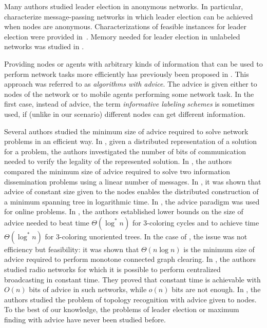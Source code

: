 \documentclass[11pt]{article}
\begin{document}
Many authors \cite{An,AtSn,ASW,BV,YK2,YK3} studied leader election
in anonymous networks. In particular, \cite{BSVCGS,YK3} characterize message-passing networks in which
leader election can be achieved when nodes are anonymous.
Characterizations of feasible instances for leader election were provided in~\cite{C,CM}.
Memory needed for leader election in unlabeled networks was studied in \cite{FP}. 







Providing nodes or agents with arbitrary kinds of information that can be used to perform network tasks more efficiently has previously been
proposed in \cite{AKM01,CFP,DP,EFKR,FGIP,FIP1,FIP2,FKL,FP,FPR,GPPR02,IKP,KKKP02,KKP05,SN,TZ05}. This approach was referred to as
{\em algorithms with advice}.  
The advice is given either to nodes of the network or to mobile agents performing some network task.
In the first case, instead of advice, the term {\em informative labeling schemes} is sometimes used, if (unlike in our scenario) different nodes can get different information.






Several authors studied the minimum size of advice required to solve
network problems in an efficient way. 
 In \cite{KKP05}, given a distributed representation of a solution for a problem,
the authors investigated the number of bits of communication needed to verify the legality of the represented solution.
In \cite{FIP1}, the authors compared the minimum size of advice required to
solve two information dissemination problems using a linear number of messages. 
In \cite{FKL}, it was shown that advice of constant size given to the nodes enables the distributed construction of a minimum
spanning tree in logarithmic time. 
In \cite{EFKR}, the advice paradigm was used for online problems.
In \cite{FGIP}, the authors established lower bounds on the size of advice 
needed to beat time $\Theta(\log^*n)$
for 3-coloring cycles and to achieve time $\Theta(\log^*n)$ for 3-coloring unoriented trees.  
In the case of \cite{SN}, the issue was not efficiency but feasibility: it
was shown that $\Theta(n\log n)$ is the minimum size of advice
required to perform monotone connected graph clearing.
In \cite{IKP}, the authors studied radio networks for
which it is possible to perform centralized broadcasting in constant time. They proved that constant time is achievable with
$O(n)$ bits of advice in such networks, while
$o(n)$ bits are not enough. In \cite{FPR}, the authors studied the problem of topology recognition with advice given to nodes. 
To the best of our knowledge, the problems of leader election or maximum finding with advice have never been studied before.
\end{document}
